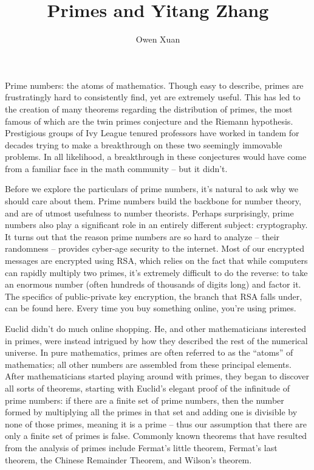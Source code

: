 \documentclass{article}
\title{Primes and Yitang Zhang}
\author{Owen Xuan}
\begin{document}
\maketitle

Prime numbers: the atoms of mathematics. Though easy to describe, primes are frustratingly hard to consistently find, yet are extremely useful. This has led to the creation of many theorems regarding the distribution of primes, the most famous of which are the twin primes conjecture and the Riemann hypothesis. Prestigious groups of Ivy League tenured professors have worked in tandem for decades trying to make a breakthrough on these two seemingly immovable problems. In all likelihood, a breakthrough in these conjectures would have come from a familiar face in the math community – but it didn’t.

Before we explore the particulars of prime numbers, it’s natural to ask why we should care about them. Prime numbers build the backbone for number theory, and are of utmost usefulness to number theorists. Perhaps surprisingly, prime numbers also play a significant role in an entirely different subject: cryptography. It turns out that the reason prime numbers are so hard to analyze – their randomness – provides cyber-age security to the internet. Most of our encrypted messages are encrypted using RSA, which relies on the fact that while computers can rapidly multiply two primes, it’s extremely difficult to do the reverse: to take an enormous number (often hundreds of thousands of digits long) and factor it. The specifics of public-private key encryption, the branch that RSA falls under, can be found here. Every time you buy something online, you're using primes.

Euclid didn't do much online shopping. He, and other mathematicians interested in primes, were instead intrigued by how they described the rest of the numerical universe. In pure mathematics, primes are often referred to as the “atoms” of mathematics; all other numbers are assembled from these principal elements. After mathematicians started playing around with primes, they began to discover all sorts of theorems, starting with Euclid’s elegant proof of the infinitude of prime numbers: if there are a finite set of prime numbers, then the number formed by multiplying all the primes in that set and adding one is divisible by none of those primes, meaning it is a prime – thus our assumption that there are only a finite set of primes is false. Commonly known theorems that have resulted from the analysis of primes include Fermat’s little theorem, Fermat’s last theorem, the Chinese Remainder Theorem, and Wilson’s theorem.
\end{document}
